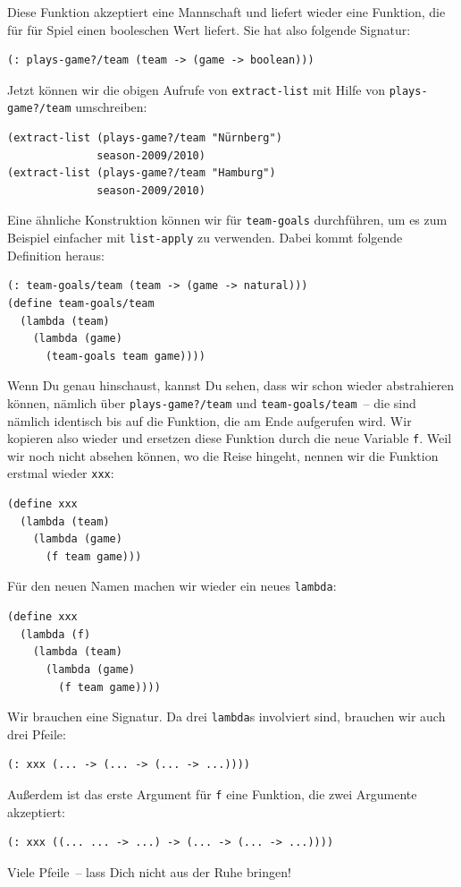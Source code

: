 Diese Funktion akzeptiert eine Mannschaft und liefert wieder eine
Funktion, die für für Spiel einen booleschen Wert liefert.  Sie hat
also folgende Signatur:
%
\begin{lstlisting}
(: plays-game?/team (team -> (game -> boolean)))
\end{lstlisting}
%
Jetzt können wir die obigen Aufrufe von \lstinline{extract-list} mit
Hilfe von \lstinline{plays-game?/team} umschreiben:
%
\begin{lstlisting}
(extract-list (plays-game?/team "Nürnberg")
              season-2009/2010)
(extract-list (plays-game?/team "Hamburg")
              season-2009/2010)
\end{lstlisting}
%
Eine ähnliche Konstruktion können wir für \lstinline{team-goals}
durchführen, um es zum Beispiel einfacher mit \lstinline{list-apply}
zu verwenden.  Dabei kommt folgende Definition heraus:
%
\begin{lstlisting}
(: team-goals/team (team -> (game -> natural)))
(define team-goals/team
  (lambda (team)
    (lambda (game)
      (team-goals team game))))
\end{lstlisting}
%
Wenn Du genau hinschaust, kannst Du sehen, dass wir schon wieder
abstrahieren können, nämlich über \lstinline{plays-game?/team} und
\lstinline{team-goals/team}~-- die sind nämlich identisch bis auf die Funktion,
die am Ende aufgerufen wird.  Wir kopieren also wieder und ersetzen
diese Funktion durch die neue Variable \lstinline{f}.  Weil wir noch
nicht absehen können, wo die Reise hingeht, nennen wir die Funktion
erstmal wieder \lstinline{xxx}:
%
\begin{lstlisting}
(define xxx
  (lambda (team)
    (lambda (game)
      (f team game)))
\end{lstlisting}
%
Für den neuen Namen machen wir wieder ein neues \lstinline{lambda}:
%
\begin{lstlisting}
(define xxx
  (lambda (f)
    (lambda (team)
      (lambda (game)
        (f team game))))
\end{lstlisting}
%
Wir brauchen eine Signatur.  Da drei \lstinline{lambda}s involviert
sind, brauchen wir auch drei Pfeile:
%
\begin{lstlisting}
(: xxx (... -> (... -> (... -> ...))))
\end{lstlisting}
%
Außerdem ist das erste Argument für \lstinline{f} eine Funktion, die
zwei Argumente akzeptiert:
%
\begin{lstlisting}
(: xxx ((... ... -> ...) -> (... -> (... -> ...))))
\end{lstlisting}
%
Viele Pfeile~-- lass Dich nicht aus der Ruhe bringen!

